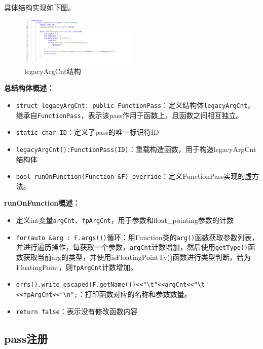 \documentclass[11pt, a4paper, oneside,UTF8]{ctexart}
\begin{document}
具体结构实现如下图。

\begin{figure}[h]
    \centering
    \includegraphics[width=0.5\textwidth]{./figure/legacy_2.png}
    \caption{legacyArgCnt结构}
    \label{figure:1.2}
\end{figure}

\textbf{总结构体概述：}
\begin{itemize}[before=]
    \setlength{\itemsep}{0em}
    \item \texttt{struct legacyArgCnt: public FunctionPass}：定义结构体\texttt{legacyArgCnt}，继承自\texttt{FunctionPass}，表示该pass作用于函数上，且函数之间相互独立。
    \item \texttt{static\ char ID}：定义了pass的唯一标识符ID
    \item \texttt{legacyArgCnt():FunctionPass(ID){}}：重载构造函数，用于构造legacyArgCnt结构体
    \item \texttt{bool runOnFunction(Function \&F) override}：定义FunctionPass实现的虚方法。
\end{itemize}

\textbf{runOnFunction概述：}
\begin{itemize}[before=]
    \setlength{\itemsep}{0em}
    \item 定义int变量\texttt{argCnt}、\texttt{fpArgCnt}，用于参数和float\_pointing参数的计数
    \item \texttt{for(auto \&arg : F.args())}循环：用Function类的\texttt{arg()}函数获取参数列表，并进行遍历操作，每获取一个参数，\texttt{argCnt}计数增加，然后使用\texttt{getType()}函数获取当前arg的类型，并使用{isFloatingPointTy()}函数进行类型判断，若为FloatingPoint，则\texttt{fpArgCnt}计数增加。
    \item \texttt{errs().write\_escaped(F.getName())<<"\textbackslash t"<<argCnt<<"\textbackslash t"<<fpArgCnt<<"\textbackslash n";}：打印函数对应的名称和参数数量。
    \item \texttt{return false}：表示没有修改函数内容
\end{itemize}

\subsection{pass注册}
\end{document}
